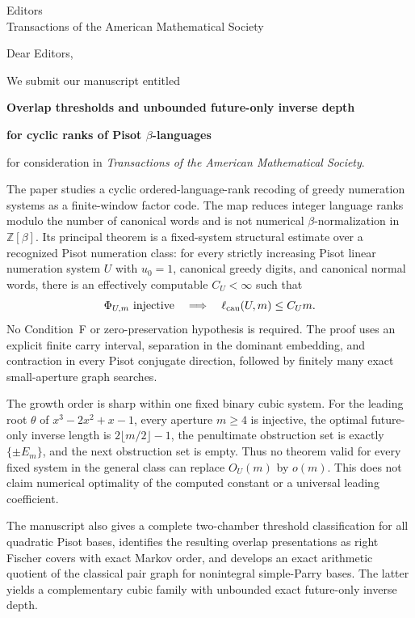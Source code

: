 \documentclass[11pt]{letter}
\date{\today}
\begin{document}
\begin{letter}{Editors\\Transactions of the American Mathematical Society}

\opening{Dear Editors,}

We submit our manuscript entitled

\medskip
\centerline{\textbf{Overlap thresholds and unbounded future-only inverse depth}}
\centerline{\textbf{for cyclic ranks of Pisot $\beta$-languages}}
\medskip

\noindent for consideration in \textit{Transactions of the American
Mathematical Society}.

The paper studies a cyclic ordered-language-rank recoding of greedy
numeration systems as a finite-window factor code.  The map reduces integer
language ranks modulo the number of canonical words and is not numerical
$\beta$-normalization in $\mathbb Z[\beta]$.  Its principal theorem is a
fixed-system structural estimate over a recognized Pisot numeration class:
for every strictly increasing Pisot linear numeration system $U$ with
$u_0=1$, canonical greedy digits, and canonical normal words, there is an
effectively computable $C_U<\infty$ such that
\[
 \Phi_{U,m}\text{ injective}\quad\Longrightarrow\quad
 \ell_{\rm cau}(U,m)\le C_Um.
\]
No Condition~F or zero-preservation hypothesis is required.  The proof uses
an explicit finite carry interval, separation in the dominant embedding, and
contraction in every Pisot conjugate direction, followed by finitely many
exact small-aperture graph searches.

The growth order is sharp within one fixed binary cubic system.  For the
leading root $\theta$ of $x^3-2x^2+x-1$, every aperture $m\ge4$ is injective,
the optimal future-only inverse length is
$2\lfloor m/2\rfloor-1$, the penultimate obstruction set is exactly
$\{\pm E_m\}$, and the next obstruction set is empty.  Thus no theorem valid
for every fixed system in the general class can replace $O_U(m)$ by $o(m)$.
This does not claim numerical optimality of the computed constant or a
universal leading coefficient.

The manuscript also gives a complete two-chamber threshold classification
for all quadratic Pisot bases, identifies the resulting overlap
presentations as right Fischer covers with exact Markov order, and develops
an exact arithmetic quotient of the classical pair graph for nonintegral
simple-Parry bases.  The latter yields a complementary cubic family with
unbounded exact future-only inverse depth.


\end{letter}
\end{document}
